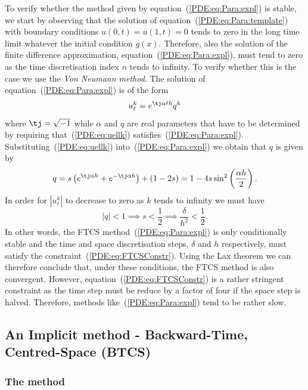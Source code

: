 To verify whether the method given by
equation~(\ref{PDE:eq:Para:expl}) is stable, we start by observing
that the solution of equation~(\ref{PDE:eq:Para:template}) with
boundary conditions $u(0,t)=u(1,t)=0$ tends to zero in the long time
limit whatever the initial condition $g(x)$.  Therefore, also the
solution of the finite difference approximation,
equation~(\ref{PDE:eq:Para:expl}), must tend to zero as the time
discretisation index $n$ tends to infinity.  To verify whether this is
the case we use the \textit{Von Neumann method}.  The solution of
equation~(\ref{PDE:eq:Para:expl}) is of the form
%
\begin{equation}
  u_{\ell}^{k} = e^{\tj \alpha \ell h} q^k
  \label{PDE:eq:uellk}
\end{equation}
%
where $\tj = \sqrt{-1}$ while $\alpha$ and $q$ are real parameters
that have to be determined by requiring that~(\ref{PDE:eq:uellk})
satisfies~(\ref{PDE:eq:Para:expl}).  Substituting~(\ref{PDE:eq:uellk})
into~(\ref{PDE:eq:Para:expl}) we obtain that $q$ is given by
%
\begin{equation*}
  q = s \left ( e^{\tj \alpha h} + e^{-\tj \alpha h} \right ) + (1 - 2s) =
  1 - 4 s \sin^2 \left ( \frac{\alpha h}{2} \right ) .
\end{equation*}
%
In order for $|u_{\ell}^{k}|$ to decrease to zero as $k$ tends to
infinity we must have
%
\begin{equation}
  |q| < 1 \implies s < \frac{1}{2} \implies
  \frac{\delta}{h^2} < \frac{1}{2} .
  \label{PDE:eq:FTCSConstr}
\end{equation}
%
In other words, the FTCS method~(\ref{PDE:eq:Para:expl}) is only
conditionally stable and the time and space discretisation steps,
$\delta$ and $h$ respectively, must satisfy the
constraint~(\ref{PDE:eq:FTCSConstr}).  Using the Lax theorem we can
therefore conclude that, under these conditions, the FTCS method is
also convergent.  However, equation~(\ref{PDE:eq:FTCSConstr}) is a
rather stringent constraint as the time step must be reduce by a
factor of four if the space step is halved.  Therefore, methods
like~(\ref{PDE:eq:Para:expl}) tend to be rather slow.

\subsection[Backward-Time, Centred-Space (BTCS)]{An Implicit method - Backward-Time, Centred-Space (BTCS)}

\subsubsection{The method}

